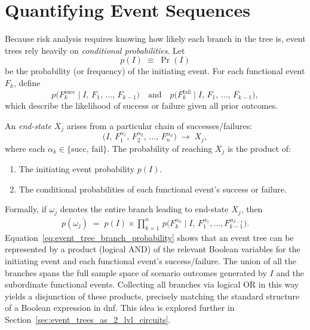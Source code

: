 \section{Quantifying Event Sequences}

Because risk analysis requires knowing how likely each branch in the tree is, event trees rely heavily on \emph{conditional probabilities}. Let
\[
    p(I)
    \;\equiv\;
    \Pr(I)
\]
be the probability (or frequency) of the initiating event. For each functional event \(F_k\), define
\[
    p\bigl(F_k^{\text{succ}}\mid I,\, F_1,\,\dots,\,F_{k-1}\bigr)
    \quad\text{and}\quad
    p\bigl(F_k^{\text{fail}}\mid I,\, F_1,\,\dots,\,F_{k-1}\bigr),
\]
which describe the likelihood of success or failure given all prior outcomes.

An \emph{end-state} \(X_j\) arises from a particular chain of successes/failures:
\[
    \bigl(I,\,F_1^{\alpha_1},\,F_2^{\alpha_2},\,\ldots,\,F_n^{\alpha_n}\bigr)
    \;\longrightarrow\; 
    X_j,
\]
where each \(\alpha_k \in \{\text{succ},\,\text{fail}\}\). The probability of reaching \(X_j\) is the product of:
\begin{enumerate}
    \item The initiating event probability \(p(I)\).
    \item The conditional probabilities of each functional event's success or failure.
\end{enumerate}
Formally, if \(\omega_j\) denotes the entire branch leading to end-state \(X_j\), then
\begin{align}
\label{eq:event_tree_branch_probability}
    p(\omega_j)
    \;=\;
    p(I)
    \times
    \prod_{k=1}^{n}\,
    p\!\bigl(F_k^{\alpha_k}\mid 
             I,\,
             F_1^{\alpha_1},\ldots,
             F_{k-1}^{\alpha_{k-1}}\bigr).
\end{align}
Equation~\ref{eq:event_tree_branch_probability} shows that an event tree can be represented by a product (logical AND) of the relevant Boolean variables for the initiating event and each functional event’s success/failure. The union of all the branches spans the full sample space of scenario outcomes generated by \(I\) and the subordinate functional events. Collecting all branches via logical OR in this way yields a disjunction of these products, precisely matching the standard structure of a Boolean expression in \acrfull{dnf}. This idea is explored further in Section~\ref{sec:event_trees_as_2_lvl_circuits}.